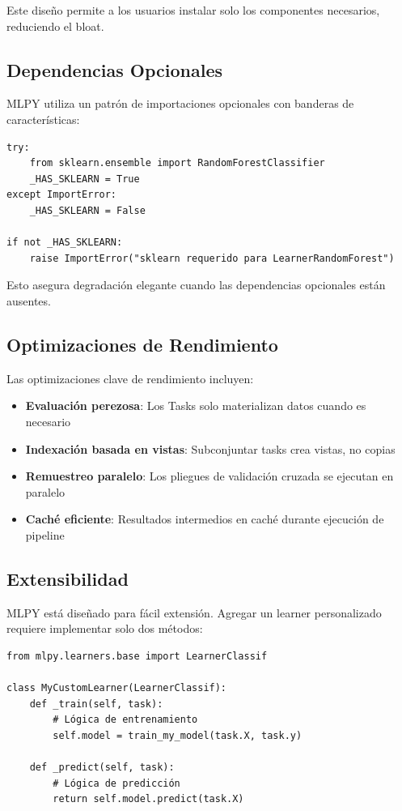 \documentclass[twoside,11pt]{article}
\begin{document}
Este diseño permite a los usuarios instalar solo los componentes necesarios, reduciendo el bloat.

\subsection{Dependencias Opcionales}

MLPY utiliza un patrón de importaciones opcionales con banderas de características:

\begin{lstlisting}
try:
    from sklearn.ensemble import RandomForestClassifier
    _HAS_SKLEARN = True
except ImportError:
    _HAS_SKLEARN = False

if not _HAS_SKLEARN:
    raise ImportError("sklearn requerido para LearnerRandomForest")
\end{lstlisting}

Esto asegura degradación elegante cuando las dependencias opcionales están ausentes.

\subsection{Optimizaciones de Rendimiento}

Las optimizaciones clave de rendimiento incluyen:
\begin{itemize}
  \item \textbf{Evaluación perezosa}: Los Tasks solo materializan datos cuando es necesario
  \item \textbf{Indexación basada en vistas}: Subconjuntar tasks crea vistas, no copias
  \item \textbf{Remuestreo paralelo}: Los pliegues de validación cruzada se ejecutan en paralelo
  \item \textbf{Caché eficiente}: Resultados intermedios en caché durante ejecución de pipeline
\end{itemize}

\subsection{Extensibilidad}

MLPY está diseñado para fácil extensión. Agregar un learner personalizado requiere implementar solo dos métodos:

\begin{lstlisting}
from mlpy.learners.base import LearnerClassif

class MyCustomLearner(LearnerClassif):
    def _train(self, task):
        # Lógica de entrenamiento
        self.model = train_my_model(task.X, task.y)

    def _predict(self, task):
        # Lógica de predicción
        return self.model.predict(task.X)
\end{lstlisting}
\end{document}
